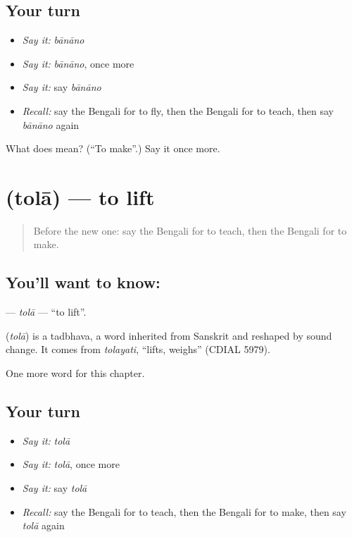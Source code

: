 \subsection*{Your turn}
\begin{itemize}
\raggedright
  \item \emph{Say it:} \emph{bānāno}
  \item \emph{Say it:} \emph{bānāno}, once more
  \item \emph{Say it:} say \emph{bānāno}
  \item \emph{Recall:} say the Bengali for to fly, then the Bengali for to teach, then say \emph{bānāno} again
\end{itemize}

\begin{tcolorbox}[breakable,colback=teal!4,colframe=teal!35!black,title={Before you move on}]
What does  mean? (\textquotedblleft{}To make\textquotedblright{}.) Say it once more.
\end{tcolorbox}
\section[\texorpdfstring{\bn{তোলা} (tolā)}{তোলা (tolā)}]{ (tolā) — to lift}

\label{lesson:BN-C54-tola}



\begin{quote}
Before the new one: say the Bengali for to teach, then the Bengali for to make.
\end{quote}

\subsection*{You'll want to know: }
\textbf{} — \emph{tolā} — \textquotedblleft{}to lift\textquotedblright{}.

\begin{cousinweb}
\textbf{} (\emph{tolā}) is a tadbhava, a word inherited from Sanskrit and reshaped by sound change. It comes from \emph{tolayati}, \textquotedblleft{}lifts, weighs\textquotedblright{} (CDIAL 5979).
\end{cousinweb}

\begin{grammarlens}[title={What you've built}]
One more word for this chapter.
\end{grammarlens}

\subsection*{Your turn}
\begin{itemize}
\raggedright
  \item \emph{Say it:} \emph{tolā}
  \item \emph{Say it:} \emph{tolā}, once more
  \item \emph{Say it:} say \emph{tolā}
  \item \emph{Recall:} say the Bengali for to teach, then the Bengali for to make, then say \emph{tolā} again
\end{itemize}

